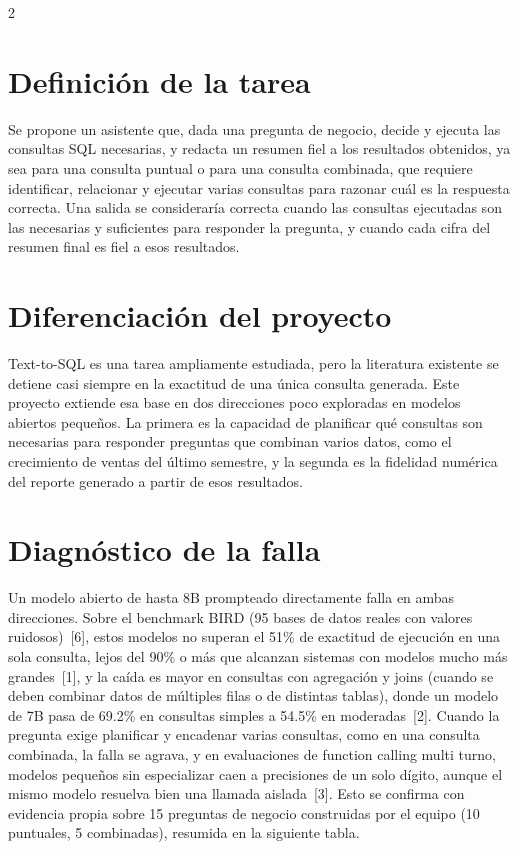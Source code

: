 \documentclass[10pt]{article}
\begin{document}
\begin{multicols}{2}

\section{Definici\'on de la tarea}
Se propone un asistente que, dada una pregunta de negocio, decide y ejecuta las consultas SQL necesarias, y redacta un resumen fiel a los resultados obtenidos, ya sea para una consulta puntual o para una consulta combinada, que requiere identificar, relacionar y ejecutar varias consultas para razonar cu\'al es la respuesta correcta. Una salida se considerar\'ia correcta cuando las consultas ejecutadas son las necesarias y suficientes para responder la pregunta, y cuando cada cifra del resumen final es fiel a esos resultados.

\section{Diferenciaci\'on del proyecto}
Text-to-SQL es una tarea ampliamente estudiada, pero la literatura existente se detiene casi siempre en la exactitud de una \'unica consulta generada. Este proyecto extiende esa base en dos direcciones poco exploradas en modelos abiertos peque\~nos. La primera es la capacidad de planificar qu\'e consultas son necesarias para responder preguntas que combinan varios datos, como el crecimiento de ventas del \'ultimo semestre, y la segunda es la fidelidad num\'erica del reporte generado a partir de esos resultados.

\section{Diagn\'ostico de la falla}
Un modelo abierto de hasta 8B prompteado directamente falla en ambas direcciones. Sobre el benchmark BIRD (95 bases de datos reales con valores ruidosos)~[6], estos modelos no superan el 51\% de exactitud de ejecuci\'on en una sola consulta, lejos del 90\% o m\'as que alcanzan sistemas con modelos mucho m\'as grandes~[1], y la ca\'ida es mayor en consultas con agregaci\'on y joins (cuando se deben combinar datos de m\'ultiples filas o de distintas tablas), donde un modelo de 7B pasa de 69.2\% en consultas simples a 54.5\% en moderadas~[2]. Cuando la pregunta exige planificar y encadenar varias consultas, como en una consulta combinada, la falla se agrava, y en evaluaciones de function calling multi turno, modelos peque\~nos sin especializar caen a precisiones de un solo d\'igito, aunque el mismo modelo resuelva bien una llamada aislada~[3]. Esto se confirma con evidencia propia sobre 15 preguntas de negocio construidas por el equipo (10 puntuales, 5 combinadas), resumida en la siguiente tabla.


\end{multicols}
\end{document}
